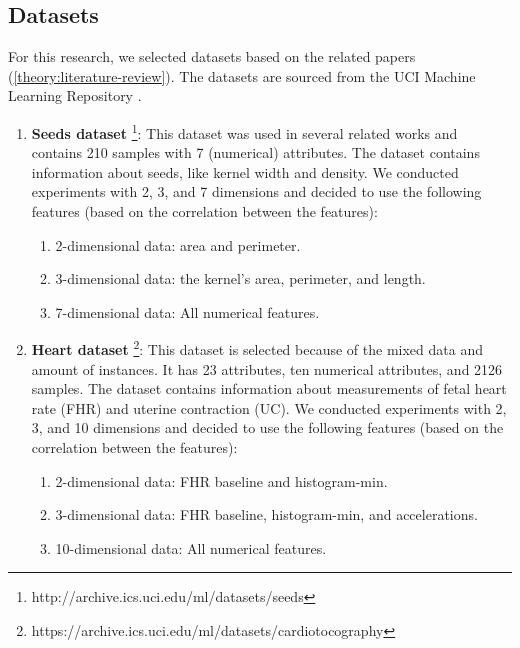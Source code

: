 \begin{enumerate}
\begin{enumerate}
        \end{enumerate}
\end{enumerate}

\subsection{Datasets} \label{datasets-section}
For this research, we selected datasets based on the related papers (\ref{theory:literature-review}).
The datasets are sourced from the UCI Machine Learning Repository \citep{noauthor_uci_nodate}.
\begin{enumerate}
  \item \textbf{Seeds dataset} \footnote{http://archive.ics.uci.edu/ml/datasets/seeds}: This dataset was used in several related works and contains 210 samples with 7 (numerical) attributes.
        The dataset contains information about seeds, like kernel width and density.
        We conducted experiments with 2, 3, and 7 dimensions and decided to use the following features (based on the correlation between the features):
        \begin{enumerate}
          \item 2-dimensional data: area and perimeter.
          \item 3-dimensional data: the kernel's area, perimeter, and length.
          \item 7-dimensional data: All numerical features.
        \end{enumerate}
  \item \textbf{Heart dataset} \footnote{https://archive.ics.uci.edu/ml/datasets/cardiotocography}: This dataset is selected because of the mixed data and amount of instances.
        It has 23 attributes, ten numerical attributes, and 2126 samples.
        The dataset contains information about measurements of fetal heart rate (FHR) and uterine contraction (UC).
        We conducted experiments with 2, 3, and 10 dimensions and decided to use the following features (based on the correlation between the features):
        \begin{enumerate}
          \item 2-dimensional data: FHR baseline and histogram-min.
          \item 3-dimensional data: FHR baseline, histogram-min, and accelerations.
          \item 10-dimensional data: All numerical features.
        \end{enumerate}
\end{enumerate}
